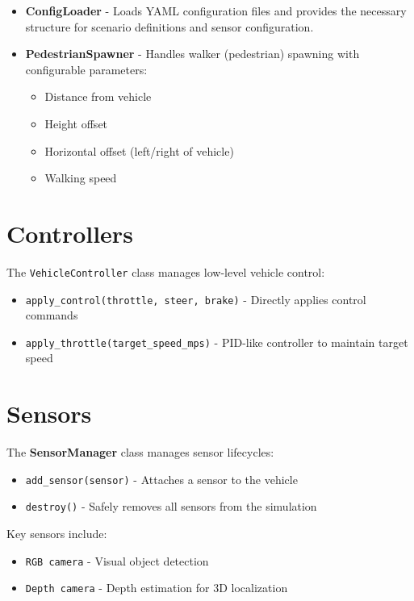 \begin{itemize}
    \item \textbf{ConfigLoader} - Loads YAML configuration files and provides the necessary structure for scenario definitions and sensor configuration.

    \item \textbf{PedestrianSpawner} - Handles walker (pedestrian) spawning with configurable parameters:
    \begin{itemize}
        \item Distance from vehicle
        \item Height offset
        \item Horizontal offset (left/right of vehicle)
        \item Walking speed
    \end{itemize}
\end{itemize}

\section{Controllers}

The \texttt{VehicleController} class manages low-level vehicle control:

\begin{itemize}
    \item \texttt{apply\_control(throttle, steer, brake)} - Directly applies control commands
    \item \texttt{apply\_throttle(target\_speed\_mps)} - PID-like controller to maintain target speed
\end{itemize}

\section{Sensors}

The \textbf{SensorManager} class manages sensor lifecycles:

\begin{itemize}
    \item \texttt{add\_sensor(sensor)} - Attaches a sensor to the vehicle
    \item \texttt{destroy()} - Safely removes all sensors from the simulation
\end{itemize}

Key sensors include:
\begin{itemize}
    \item \texttt{RGB camera} - Visual object detection
    \item \texttt{Depth camera} - Depth estimation for 3D localization
\end{itemize}

